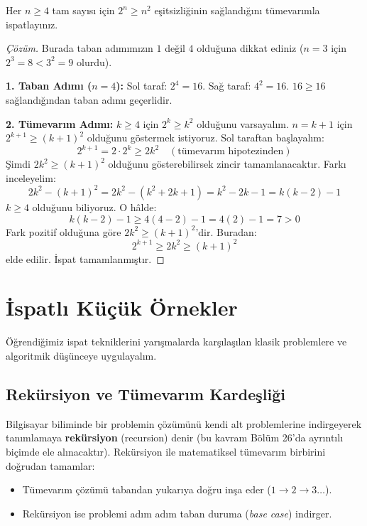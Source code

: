 \begin{example}
Her $n \ge 4$ tam sayısı için $2^n \ge n^2$ eşitsizliğinin sağlandığını tümevarımla ispatlayınız.
\end{example}
\begin{proof}[Çözüm]
Burada taban adımımızın $1$ değil $4$ olduğuna dikkat ediniz ($n=3$ için $2^3 = 8 < 3^2 = 9$ olurdu).

\textbf{1. Taban Adımı ($n = 4$):}
Sol taraf: $2^4 = 16$.
Sağ taraf: $4^2 = 16$.
$16 \ge 16$ sağlandığından taban adımı geçerlidir.

\textbf{2. Tümevarım Adımı:}
$k \ge 4$ için $2^k \ge k^2$ olduğunu varsayalım.
$n = k+1$ için $2^{k+1} \ge (k+1)^2$ olduğunu göstermek istiyoruz.
Sol taraftan başlayalım:
\[ 2^{k+1} = 2 \cdot 2^k \ge 2k^2 \quad (\text{tümevarım hipotezinden}) \]
Şimdi $2k^2 \ge (k+1)^2$ olduğunu gösterebilirsek zincir tamamlanacaktır. Farkı inceleyelim:
\[ 2k^2 - (k+1)^2 = 2k^2 - (k^2 + 2k + 1) = k^2 - 2k - 1 = k(k - 2) - 1 \]
$k \ge 4$ olduğunu biliyoruz. O hâlde:
\[ k(k - 2) - 1 \ge 4(4 - 2) - 1 = 4(2) - 1 = 7 > 0 \]
Fark pozitif olduğuna göre $2k^2 \ge (k+1)^2$'dir. Buradan:
\[ 2^{k+1} \ge 2k^2 \ge (k+1)^2 \]
elde edilir. İspat tamamlanmıştır.
\end{proof}


\section{İspatlı Küçük Örnekler}

Öğrendiğimiz ispat tekniklerini yarışmalarda karşılaşılan klasik problemlere ve algoritmik düşünceye uygulayalım.

\subsection{Rekürsiyon ve Tümevarım Kardeşliği}

Bilgisayar biliminde bir problemin çözümünü kendi alt problemlerine indirgeyerek tanımlamaya \textbf{rekürsiyon} (recursion) denir (bu kavram Bölüm 26'da ayrıntılı biçimde ele alınacaktır). Rekürsiyon ile matematiksel tümevarım birbirini doğrudan tamamlar:
\begin{itemize}
  \item Tümevarım çözümü tabandan yukarıya doğru inşa eder ($1 \to 2 \to 3 \dots$).
  \item Rekürsiyon ise problemi adım adım taban duruma (\textit{base case}) indirger.
\end{itemize}

